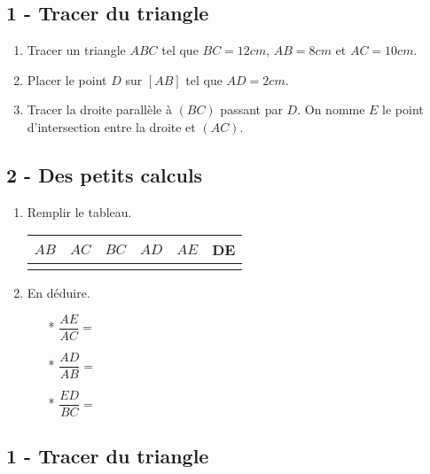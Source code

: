 \documentclass[11pt]{article}
\begin{document}
\vspace{1cm}
\subsection*{1 - Tracer du triangle}

\begin{enumerate}
\item Tracer un triangle $ABC$ tel que $BC = 12cm$, $AB = 8cm$ et $AC = 10cm$.
\item Placer le point $D$ sur $[AB]$ tel que $AD = 2cm$.
\item Tracer la droite parallèle à $(BC)$ passant par $D$. On nomme $E$ le point d'intersection entre la droite et $(AC)$.
\end{enumerate}

\subsection*{2 - Des petits calculs}

\begin{enumerate}

\item Remplir le tableau.
  \begin{center}
    \begin{tabular}{| c | c | c | c | c | c |}
      \hline
      $AB$    & $AC$ & $BC$ & $AD$ & $AE$  & DE \\
      \hline
      \phantom{1234567890} & \phantom{1234567890} & \phantom{1234567890} & \phantom{1234567890} & \phantom{1234567890} &  \phantom{1234567890} \\
      \hline
    \end{tabular}
  \end{center}

\item En déduire.
  \begin{multicols}{3}
    \begin{itemize}
    \item[*] $\dfrac{AE}{AC} = $
    \item[*] $\dfrac{AD}{AB} = $
    \item[*] $\dfrac{ED}{BC} = $
    \end{itemize}
  \end{multicols}
\end{enumerate}

\vspace{1cm}
\subsection*{1 - Tracer du triangle}
\end{document}
